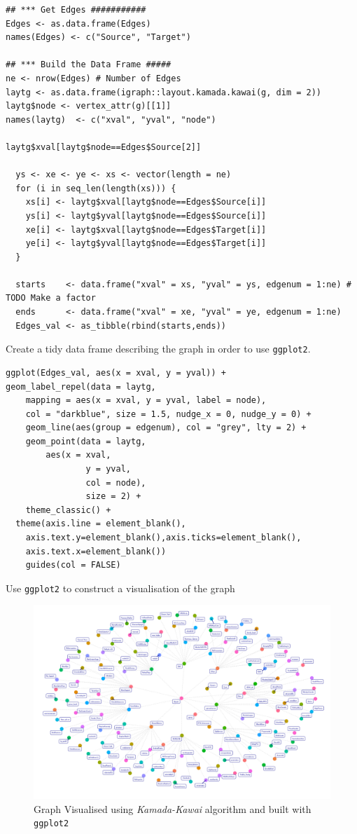 \documentclass[11pt]{article}
\begin{document}
\begin{listing}[htbp]
\begin{verbatim}
## *** Get Edges ###########
Edges <- as.data.frame(Edges)
names(Edges) <- c("Source", "Target")

## *** Build the Data Frame #####
ne <- nrow(Edges) # Number of Edges
laytg <- as.data.frame(igraph::layout.kamada.kawai(g, dim = 2))
laytg$node <- vertex_attr(g)[[1]]
names(laytg)  <- c("xval", "yval", "node")

laytg$xval[laytg$node==Edges$Source[2]]

  ys <- xe <- ye <- xs <- vector(length = ne)
  for (i in seq_len(length(xs))) {
    xs[i] <- laytg$xval[laytg$node==Edges$Source[i]]
    ys[i] <- laytg$yval[laytg$node==Edges$Source[i]]
    xe[i] <- laytg$xval[laytg$node==Edges$Target[i]]
    ye[i] <- laytg$yval[laytg$node==Edges$Target[i]]
  }

  starts    <- data.frame("xval" = xs, "yval" = ys, edgenum = 1:ne) # TODO Make a factor
  ends      <- data.frame("xval" = xe, "yval" = ye, edgenum = 1:ne)
  Edges_val <- as_tibble(rbind(starts,ends))
\end{verbatim}
\caption{\label{org8a48f94}Create a tidy data frame describing the graph in order to use \texttt{ggplot2}.}
\end{listing}

\begin{listing}[htbp]
\begin{verbatim}
ggplot(Edges_val, aes(x = xval, y = yval)) +
geom_label_repel(data = laytg,
    mapping = aes(x = xval, y = yval, label = node),
    col = "darkblue", size = 1.5, nudge_x = 0, nudge_y = 0) +
    geom_line(aes(group = edgenum), col = "grey", lty = 2) +
    geom_point(data = laytg,
        aes(x = xval,
                y = yval,
                col = node),
                size = 2) +
    theme_classic() +
  theme(axis.line = element_blank(),
    axis.text.y=element_blank(),axis.ticks=element_blank(),
    axis.text.x=element_blank())
    guides(col = FALSE)
\end{verbatim}
\caption{\label{org5ca3310}Use \texttt{ggplot2} to construct a visualisation of the graph}
\end{listing}

\begin{figure}[htbp]
\centering
\includegraphics[width=12cm]{./Figures/ggGraph.png}
\caption{\label{fig:orgaad8781}Graph Visualised using \emph{Kamada-Kawai} algorithm and built with \texttt{ggplot2}}
\end{figure}
\end{document}

